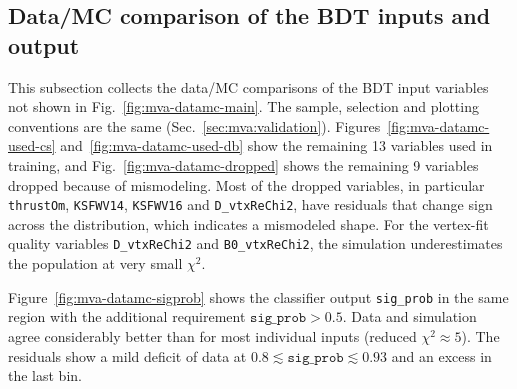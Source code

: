 \subsection{Data/MC comparison of the BDT inputs and output}
\label{app:mva:datamc}

This subsection collects the data/MC comparisons of the BDT input variables
not shown in Fig.~\ref{fig:mva-datamc-main}. The sample, selection and
plotting conventions are the same (Sec.~\ref{sec:mva:validation}).
Figures~\ref{fig:mva-datamc-used-cs} and~\ref{fig:mva-datamc-used-db} show
the remaining 13 variables used in training, and
Fig.~\ref{fig:mva-datamc-dropped} shows the remaining 9 variables dropped
because of mismodeling.
Most of the dropped variables, in particular \texttt{thrustOm},
\texttt{KSFWV14}, \texttt{KSFWV16} and \texttt{D\_vtxReChi2}, have residuals
that change sign across the distribution, which indicates a mismodeled shape.
For the vertex-fit quality variables \texttt{D\_vtxReChi2} and
\texttt{B0\_vtxReChi2}, the simulation underestimates the population at very
small $\chi^{2}$.

Figure~\ref{fig:mva-datamc-sigprob} shows the classifier output
\texttt{sig\_prob} in the same region with the additional requirement
$\texttt{sig\_prob} > 0.5$.
Data and simulation agree considerably better than for most individual inputs
(reduced $\chi^{2} \approx 5$).
The residuals show a mild deficit of data at
$0.8 \lesssim \texttt{sig\_prob} \lesssim 0.93$ and an excess in the last bin.

